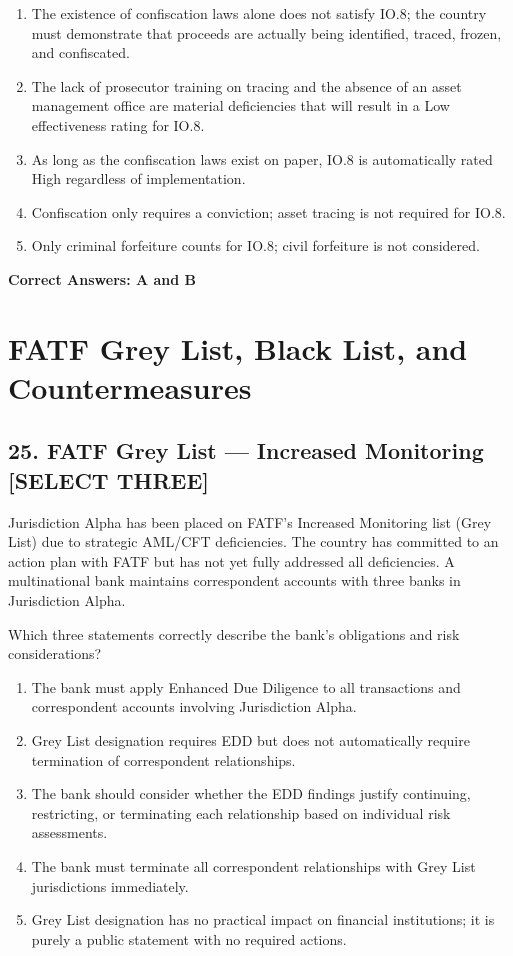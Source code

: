 \documentclass[11pt,a4paper]{article}
\begin{document}
	\begin{enumerate}[label=\Alph*.]
		\item The existence of confiscation laws alone does not satisfy IO.8; the country must demonstrate that proceeds are actually being identified, traced, frozen, and confiscated.
		\item The lack of prosecutor training on tracing and the absence of an asset management office are material deficiencies that will result in a Low effectiveness rating for IO.8.
		\item As long as the confiscation laws exist on paper, IO.8 is automatically rated High regardless of implementation.
		\item Confiscation only requires a conviction; asset tracing is not required for IO.8.
		\item Only criminal forfeiture counts for IO.8; civil forfeiture is not considered.
	\end{enumerate}
	
	\textbf{Correct Answers: A and B}
	
	\section{FATF Grey List, Black List, and Countermeasures}
	
	\subsection{25. FATF Grey List — Increased Monitoring \textnormal{[SELECT THREE]}}
	
	Jurisdiction Alpha has been placed on FATF's Increased Monitoring list (Grey List) due to strategic AML/CFT deficiencies. The country has committed to an action plan with FATF but has not yet fully addressed all deficiencies. A multinational bank maintains correspondent accounts with three banks in Jurisdiction Alpha.
	
	Which three statements correctly describe the bank's obligations and risk considerations?
	
	\begin{enumerate}[label=\Alph*.]
		\item The bank must apply Enhanced Due Diligence to all transactions and correspondent accounts involving Jurisdiction Alpha.
		\item Grey List designation requires EDD but does not automatically require termination of correspondent relationships.
		\item The bank should consider whether the EDD findings justify continuing, restricting, or terminating each relationship based on individual risk assessments.
		\item The bank must terminate all correspondent relationships with Grey List jurisdictions immediately.
		\item Grey List designation has no practical impact on financial institutions; it is purely a public statement with no required actions.
	\end{enumerate}
	
\end{document}
